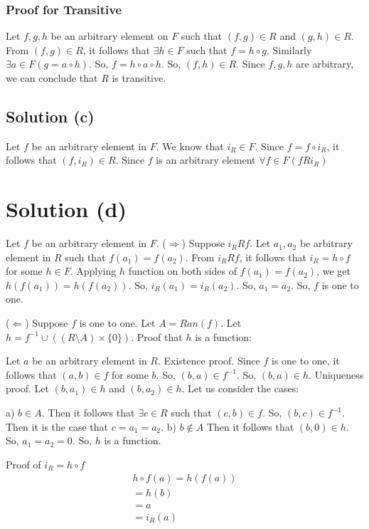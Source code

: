 \documentclass{article}
\begin{document}
\subsubsection{Proof for Transitive}
Let $f,g,h$ be an arbitrary element on $F$ such that $(f,g) \in R$ and
$(g,h) \in R$. From $(f,g) \in R$, it follows that $\exists h \in F$
such that $f = h \circ g$. Similarly $\exists a \in F(g = a \circ h)$.
So, $f = h \circ a \circ h$. So, $(f,h) \in R$. Since $f,g,h$ are
arbitrary, we can conclude that $R$ is transitive.

\subsection{Solution (c)}
Let $f$ be an arbitrary element in $F$. We know that $i_R \in F$.
Since $f = f \circ i_R$, it follows that $(f,i_R) \in R$. Since $f$ is
an arbitrary element $\forall f \in F(fRi_R)$

\section{Solution (d)}
Let $f$ be an arbitrary element in $F$.
($\Rightarrow$) Suppose $i_RRf$. Let $a_1, a_2$ be arbitrary element
in $R$ such that $f(a_1) = f(a_2)$. From $i_RRf$, it follows that $i_R
= h \circ f$ for some $h \in F$. Applying $h$ function on both sides
of $f(a_1) = f(a_2)$, we get $h(f(a_1)) = h(f(a_2))$. So, $i_R(a_1) =
i_R(a_2)$. So, $a_1 = a_2$. So, $f$ is one to one.

($\Leftarrow$) Suppose $f$ is one to one. Let $A = Ran(f)$. Let $h =
f^{-1} \cup ((R \setminus A) \times \{0\})$. Proof that $h$ is a
function:

Let $a$ be an arbitrary element in $R$.
Existence proof. Since $f$ is one to one, it follows that $(a,b) \in
f$ for some $b$. So, $(b,a) \in f^{-1}$. So, $(b,a) \in h$.
Uniqueness proof. Let $(b,a_1) \in h$ and $(b,a_2) \in h$. Let us
consider the cases:

a) $b \in A$. Then it follows that $\exists c \in R$ such that $(c,b)
\in f$. So, $(b,c) \in f^{-1}$. Then it is the case that $c = a_1 =
a_2$.
b) $b \notin A$ Then it follows that $(b,0) \in h$. So, $a_1 = a_2 =
0$. So, $h$ is a function.

Proof of $i_R = h \circ f$
\begin{align*}
  h \circ f(a) = h(f(a)) \\
  = h(b) \\
  = a \\
  = i_R(a)  
\end{align*}
\end{document}
